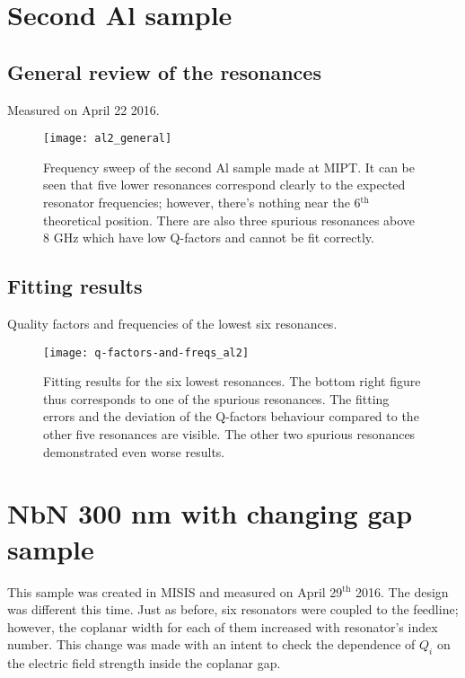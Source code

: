 \documentclass[12pt]{article}
\numberwithin{equation}{section}
\begin{document}
\section{Second Al sample}

\subsection{General review of the resonances}

Measured on April 22 2016.

\begin{figure}[h]
\centering
\texttt{[image: al2\_general]}
\caption{Frequency sweep of the second Al sample made at MIPT. It can be seen that five lower resonances correspond clearly to the expected resonator frequencies; however, there's nothing near the 6$^{\text{th}}$ theoretical position. There are also three spurious resonances above 8 GHz which have low Q-factors and cannot be fit correctly.}
\end{figure}

\subsection{Fitting results}

Quality factors and frequencies of the lowest six resonances.

\begin{figure}[h]
\centering
\texttt{[image: q-factors-and-freqs\_al2]}
\caption{Fitting results for the six lowest resonances. The bottom right figure thus corresponds to one of the spurious resonances. The fitting errors and the deviation of the Q-factors behaviour compared to the other five resonances are visible. The other two spurious resonances demonstrated even worse results.}
\end{figure}

\section{NbN 300 nm with changing gap sample}

This sample was created in MISIS and measured on April 29$^\text{th}$ 2016. The design was different this time. Just as before, six resonators were coupled to the feedline; however, the coplanar width for each of them increased with resonator's index number. This change was made with an intent to check the dependence of $Q_i$ on the electric field strength inside the coplanar gap.
\end{document}
